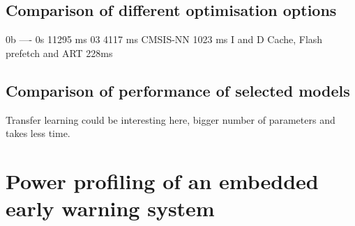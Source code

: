 


\subsection{ Comparison of different optimisation options}

0b
----
0s 11295 ms
03 4117  ms
CMSIS-NN 1023 ms
I and D Cache, Flash prefetch and ART 228ms



\subsection{ Comparison of performance of selected models}
    Transfer learning could be interesting here, bigger number of parameters and takes less time.






\section{ Power profiling of an embedded early warning system}

